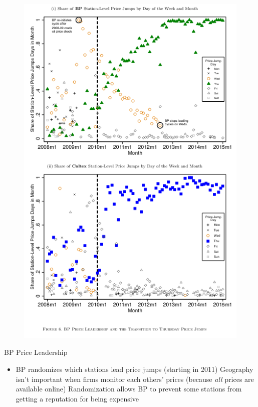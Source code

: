 \documentclass[dvipsnames]{beamer}
\begin{document}
  \begin{frame}{}
    \begin{figure}[htp]
      \centering
     \includegraphics[height=\textheight, keepaspectratio=true]{fig6.png} 
    \end{figure}
  \end{frame}
  \begin{frame}{BP Price Leadership}
    \begin{itemize}
    \item BP randomizes which stations lead price jumps (starting in 2011)
      \vitem Geography isn't important when firms monitor each others' prices (because \emph{all} prices are available online)
      \vitem Randomization allows BP to prevent some stations from getting a reputation for being expensive
    \end{itemize}
  \end{frame}
\end{document}
